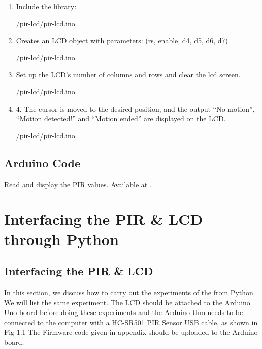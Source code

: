 \begin{enumerate}
  \item Include the library: 
        
        {\LocPIRardcode/pir-lcd/pir-lcd.ino}
\item Creates an LCD object with parameters: (rs, enable, d4, d5, d6, d7)
        
        {\LocPIRardcode/pir-lcd/pir-lcd.ino}
\item Set up the LCD's number of columns and rows and clear the lcd screen.
        
        {\LocPIRardcode/pir-lcd/pir-lcd.ino}
\item 4.	The cursor is moved to the desired position, and the output “No motion”, “Motion detected!” and “Motion ended” are displayed on the LCD.
        
        {\LocPIRardcode/pir-lcd/pir-lcd.ino}
 

\end{enumerate}


\subsection{Arduino Code}
\label{sec:ldr-arduino-code}

\begin{ardcode}
  {Read and display the PIR values.  Available at
    .}
  \label{ard:ldr-read}
  
\end{ardcode}





\section{Interfacing the PIR \& LCD through Python}
\subsection{Interfacing the PIR \& LCD}
In this section, we discuss how to carry out the experiments of the  from Python. We will list the same experiment. The LCD should be attached to the Arduino Uno board before doing these experiments and the Arduino Uno needs to be connected to the computer with a HC-SR501 PIR Sensor USB cable, as shown in Fig 1.1  The Firmware code given in appendix should be uploaded to the Arduino board.

